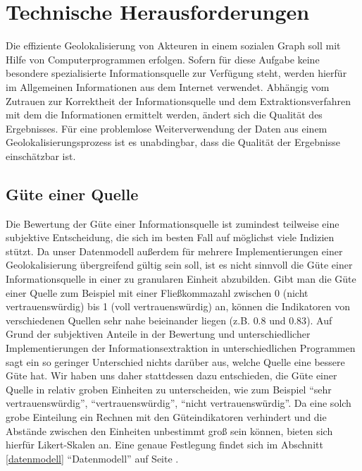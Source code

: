 \section{Technische Herausforderungen}
Die effiziente Geolokalisierung von Akteuren in einem sozialen Graph soll mit Hilfe von Computerprogrammen erfolgen. Sofern für diese Aufgabe keine besondere spezialisierte Informationsquelle zur Verfügung steht, werden hierfür im Allgemeinen Informationen aus dem Internet verwendet. Abhängig vom Zutrauen zur Korrektheit der Informationsquelle und dem Extraktionsverfahren mit dem die Informationen ermittelt werden, ändert sich die Qualität des Ergebnisses. Für eine problemlose Weiterverwendung der Daten aus einem Geolokalisierungsprozess ist es unabdingbar, dass die Qualität der Ergebnisse einschätzbar ist.

\subsection{Güte einer Quelle}
Die Bewertung der Güte einer Informationsquelle ist zumindest teilweise eine subjektive Entscheidung, die sich im besten Fall auf möglichst viele Indizien stützt. Da unser Datenmodell außerdem für mehrere Implementierungen einer Geolokalisierung übergreifend gültig sein soll, ist es nicht sinnvoll die Güte einer Informationsquelle in einer zu granularen Einheit abzubilden. Gibt man die Güte einer Quelle zum Beispiel mit einer Fließkommazahl zwischen 0 (nicht vertrauenswürdig) bis 1 (voll vertrauenswürdig) an, können die Indikatoren von verschiedenen Quellen sehr nahe beieinander liegen (z.B. $0.8$ und $0.83$). Auf Grund der subjektiven Anteile in der Bewertung und unterschiedlicher Implementierungen der Informationsextraktion in unterschiedlichen Programmen sagt ein so geringer Unterschied nichts darüber aus, welche Quelle eine bessere Güte hat. Wir haben uns daher stattdessen dazu entschieden, die Güte einer Quelle in relativ groben Einheiten zu unterscheiden, wie zum Beispiel ``sehr vertrauenswürdig'', ``vertrauenswürdig'', ``nicht vertrauenswürdig''. Da eine solch grobe Einteilung ein Rechnen\label{calc_likert} mit den Güteindikatoren verhindert und die Abstände zwischen den Einheiten unbestimmt groß sein können, bieten sich hierfür Likert-Skalen an. Eine genaue Festlegung findet sich im Abschnitt \ref{datenmodell} ``Datenmodell'' auf Seite \pageref{datenmodell}.

